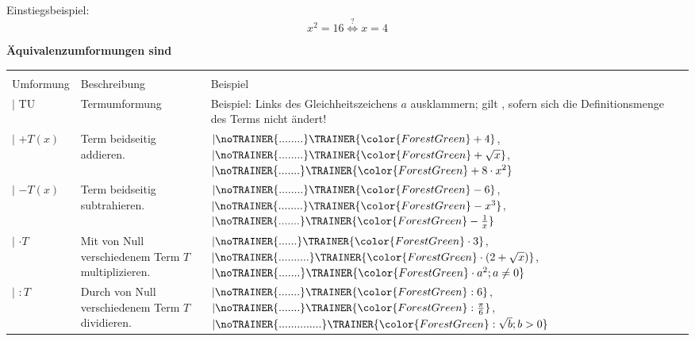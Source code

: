 


Einstiegsbeispiel:
\vspace{5mm}
$$x^2 = 16  \stackrel{?}{\Longleftrightarrow} x=4$$

\textbf{{\color{ForestGreen}Äquivalenzumformungen sind}}

\begin{tabular}{lp{6cm}p{8cm}}\hline\\%
Umformung   & Beschreibung  & Beispiel \\\hline
$| $ TU      & Termumformung & {\raggedright Beispiel: Links des Gleichheitszeichens $a$ ausklammern; gilt , sofern sich die Definitionsmenge des Terms nicht ändert!}\\
$| $ $+ T(x)$  & Term beidseitig addieren. & $| \noTRAINER{........}\TRAINER{\color{ForestGreen}+4}$, $| \noTRAINER{........}\TRAINER{\color{ForestGreen}+\sqrt{x}}$, $| \noTRAINER{.......}\TRAINER{\color{ForestGreen}+8\cdot{}x^2}$\\
$| $ $- T(x)$  & Term beidseitig subtrahieren. & $| \noTRAINER{........}\TRAINER{\color{ForestGreen}-6}$, $|\noTRAINER{........}\TRAINER{\color{ForestGreen}-x^3}$, $|\noTRAINER{.......}\TRAINER{\color{ForestGreen} -\frac1{x}}$\\
$| $ $\cdot{} T$  & Mit von Null verschiedenem Term $T$ multiplizieren. & $| \noTRAINER{......}\TRAINER{\color{ForestGreen}\cdot{} 3}$, $|\noTRAINER{..........}\TRAINER{\color{ForestGreen}\cdot{}(2+\sqrt{x})}$, $|\noTRAINER{.......}\TRAINER{\color{ForestGreen}\cdot{}a^2; a\ne 0}$\\
$| $ $: T$  & Durch von Null verschiedenem Term $T$ dividieren. & $| \noTRAINER{.......}\TRAINER{\color{ForestGreen}: 6}$, $|\noTRAINER{.......}\TRAINER{\color{ForestGreen}: \frac{\pi}6}$, $|\noTRAINER{..............}\TRAINER{\color{ForestGreen}:\sqrt{b}; b> 0}$\\
\end{tabular}

